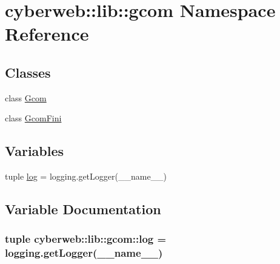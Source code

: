 \hypertarget{namespacecyberweb_1_1lib_1_1gcom}{\section{cyberweb\-:\-:lib\-:\-:gcom \-Namespace \-Reference}
\label{namespacecyberweb_1_1lib_1_1gcom}
}
\subsection*{\-Classes}
\begin{DoxyCompactItemize}
\item 
class \hyperlink{classcyberweb_1_1lib_1_1gcom_1_1_gcom}{\-Gcom}
\item 
class \hyperlink{classcyberweb_1_1lib_1_1gcom_1_1_gcom_fini}{\-Gcom\-Fini}
\end{DoxyCompactItemize}
\subsection*{\-Variables}
\begin{DoxyCompactItemize}
\item 
tuple \hyperlink{namespacecyberweb_1_1lib_1_1gcom_a1e842b2389268925f9f70a7d2e8cab7f}{log} = logging.\-get\-Logger(\-\_\-\-\_\-name\-\_\-\-\_\-)
\end{DoxyCompactItemize}


\subsection{\-Variable \-Documentation}
\hypertarget{namespacecyberweb_1_1lib_1_1gcom_a1e842b2389268925f9f70a7d2e8cab7f}{
\subsubsection[{log}]{\setlength{\rightskip}{0pt plus 5cm}tuple {\bf cyberweb\-::lib\-::gcom\-::log} = logging.\-get\-Logger(\-\_\-\-\_\-name\-\_\-\-\_\-)}}\label{namespacecyberweb_1_1lib_1_1gcom_a1e842b2389268925f9f70a7d2e8cab7f}
